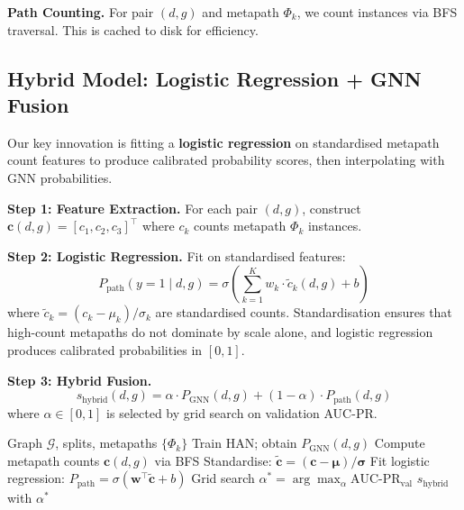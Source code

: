 \documentclass{article}
\newcommand{\Gcal}{\mathcal{G}}
\begin{document}
\textbf{Path Counting.} For pair $(d,g)$ and metapath $\Phi_k$, we count instances via BFS traversal. This is cached to disk for efficiency.

\subsection{Hybrid Model: Logistic Regression + GNN Fusion}
\label{sec:hybrid}

Our key innovation is fitting a \textbf{logistic regression} on standardised metapath count features to produce calibrated probability scores, then interpolating with GNN probabilities.

\textbf{Step 1: Feature Extraction.} For each pair $(d,g)$, construct $\mathbf{c}(d,g) = [c_1, c_2, c_3]^\top$ where $c_k$ counts metapath $\Phi_k$ instances.

\textbf{Step 2: Logistic Regression.} Fit on standardised features:
\begin{equation}
P_{\text{path}}(y=1 \mid d,g) = \sigma\!\left(\sum_{k=1}^{K} w_k \cdot \tilde{c}_k(d,g) + b\right)
\label{eq:logistic}
\end{equation}
where $\tilde{c}_k = (c_k - \mu_k)/\sigma_k$ are standardised counts. Standardisation ensures that high-count metapaths do not dominate by scale alone, and logistic regression produces calibrated probabilities in $[0,1]$.

\textbf{Step 3: Hybrid Fusion.}
\begin{equation}
\boxed{s_{\text{hybrid}}(d,g) = \alpha \cdot P_{\text{GNN}}(d,g) + (1-\alpha) \cdot P_{\text{path}}(d,g)}
\label{eq:hybrid}
\end{equation}
where $\alpha \in [0,1]$ is selected by grid search on validation AUC-PR.

\begin{algorithm}[t]
\caption{Hybrid Model Training}
\label{alg:hybrid}
\small
\begin{algorithmic}[1]
\REQUIRE Graph $\Gcal$, splits, metapaths $\{\Phi_k\}$
\STATE Train HAN; obtain $P_{\text{GNN}}(d,g)$
\STATE Compute metapath counts $\mathbf{c}(d,g)$ via BFS
\STATE Standardise: $\tilde{\mathbf{c}} = (\mathbf{c} - \boldsymbol{\mu})/\boldsymbol{\sigma}$
\STATE Fit logistic regression: $P_{\text{path}} = \sigma(\mathbf{w}^\top\tilde{\mathbf{c}} + b)$
\STATE Grid search $\alpha^* = \arg\max_\alpha \text{AUC-PR}_{\text{val}}$
\RETURN $s_{\text{hybrid}}$ with $\alpha^*$
\end{algorithmic}
\end{algorithm}
\end{document}
